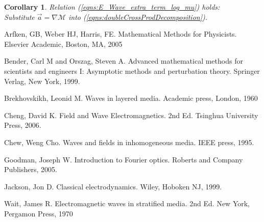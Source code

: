 \documentclass[twocolumn,secnumarabic,amssymb, nobibnotes, aps, prd]{revtex4-1}
\newtheorem{cor}{Corollary}[subsubsection]
\begin{document}
\begin{cor} Relation (\ref{eqns:E_Wave_extra_term_log_mu}) holds:\\
Substitute $\overrightarrow{a} = \nabla\mathcal{M}$ into (\ref{eqns:doubleCrossProdDecomposition}). 

\end{cor}













%

\begin{thebibliography}{2d}

Arfken, GB, Weber HJ,  Harris, FE. Mathematical Methods for Physicists. Elsevier Academic, Boston, MA, 2005

Bender, Carl M and Orszag, Steven A. Advanced mathematical methods for scientists and engineers I: Asymptotic methods and perturbation theory. Springer Verlag, New York, 1999.

Brekhovskikh, Leonid M. Waves in layered media. Academic press, London, 1960


Cheng, David K. Field and Wave Electromagnetics. 2nd Ed. Tsinghua University Press, 2006.

Chew, Weng Cho. Waves and fields in inhomogeneous media. IEEE press, 1995.

Goodman, Joseph W. Introduction to Fourier optics. Roberts and Company Publishers, 2005.

Jackson, Jon D. Classical electrodynamics. Wiley, Hoboken NJ, 1999.

Wait, James R. Electromagnetic waves in stratified media. 2nd Ed. New York, Pergamon Press, 1970






\end{thebibliography}


%	
%
%
%

%
%
%
\end{document}
